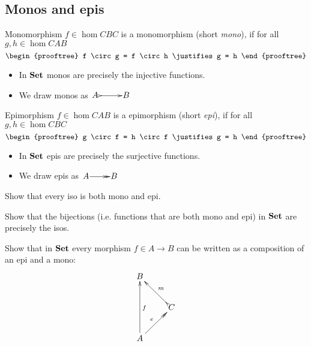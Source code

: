 \documentclass[handout]{beamer}
\newcommand{\ru}[2]{\vspace{1ex}
\begin{prooftree}
#1 \justifies #2
\end{prooftree}\vspace{1ex}}
\begin{document}
\subsection{Monos and epis}

\begin{frame}
  \begin{block}{Monomorphism}
    $f \in\hom{C}{B}{C}$ is a monomorphism (short \emph{mono}), if
    for all $g,h \in \hom{C}{A}{B}$
    \[ \ru{f \circ g = f \circ h}{g = h} \]
  \end{block}
  \pause
  \begin{itemize}
  \item<+-> In $\mathbf{Set}$ monos are precisely the injective functions.
  \item<+-> We draw monos as $\xymatrix@1{A\ \ar@{>->}[r] & B}$
  \end{itemize}

\end{frame}

\begin{frame}
  \begin{block}{Epimorphism}
    $f \in\hom{C}{A}{B}$ is a epimorphism (short \emph{epi}), if
    for all $g,h \in \hom{C}{B}{C}$
    \[ \ru{g \circ f = h \circ f}{g = h} \]
  \end{block}
  \pause
  \begin{itemize}
  \item<+-> In $\mathbf{Set}$ epis are precisely the surjective functions.
  \item<+-> We draw epis as $\xymatrix@1{A\ar@{->>}[r] & B}$
  \end{itemize}

\end{frame}

\begin{frame}

  \begin{exercise}
    Show that every iso is both mono and epi.
  \end{exercise}

  \begin{exercise}
    Show that the bijections (i.e. functions that are both mono and epi) in $\mathbf{Set}$ are precisely the isos.
  \end{exercise}

  \begin{exercise}
    Show that in $\mathbf{Set}$ every morphism $f \in A \to B$ can be
    written as a composition of an epi and a mono:
    \[\xymatrix{B \\ & \ar@{>->}[ul]_m C  \\ 
        A \ar[uu]_f \ar@{->>}[ur]^e}\]
  \end{exercise}

\end{frame}
\end{document}
